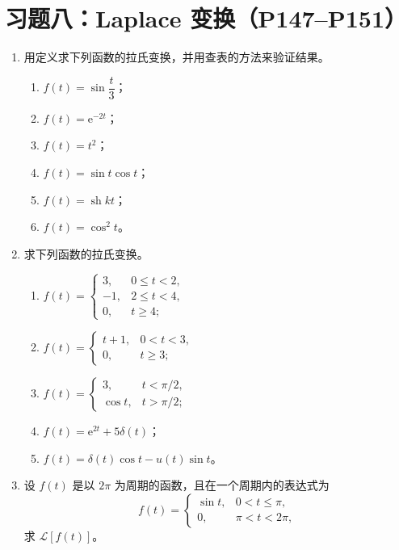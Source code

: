\documentclass[UTF8,11pt,a4paper]{ctexart}
\newcommand{\ee}{\mathrm{e}}
\newcommand{\sh}{\operatorname{sh}}
\begin{document}
\newpage
\section{习题八：Laplace 变换（P147--P151）}

\begin{enumerate}
\item 用定义求下列函数的拉氏变换，并用查表的方法来验证结果。
  \begin{enumerate}
  \item $f(t)=\sin\dfrac t3$；
  \item $f(t)=\ee^{-2t}$；
  \item $f(t)=t^2$；
  \item $f(t)=\sin t\cos t$；
  \item $f(t)=\sh kt$；
  \item $f(t)=\cos^2t$。
  \end{enumerate}

\item 求下列函数的拉氏变换。
  \begin{enumerate}
  \item $\displaystyle f(t)=\begin{cases}3,&0\leqslant t<2,\\-1,&2\leqslant t<4,\\0,&t\geqslant4;\end{cases}$
  \item $\displaystyle f(t)=\begin{cases}t+1,&0<t<3,\\0,&t\geqslant3;\end{cases}$
  \item $\displaystyle f(t)=\begin{cases}3,&t<\pi/2,\\\cos t,&t>\pi/2;\end{cases}$
  \item $f(t)=\ee^{2t}+5\delta(t)$；
  \item $f(t)=\delta(t)\cos t-u(t)\sin t$。
  \end{enumerate}

\item 设 $f(t)$ 是以 $2\pi$ 为周期的函数，且在一个周期内的表达式为
\[
f(t)=\begin{cases}\sin t,&0<t\leqslant\pi,\\0,&\pi<t<2\pi,
\end{cases}
\]
求 $\mathcal L[f(t)]$。


\end{enumerate}
\end{document}
